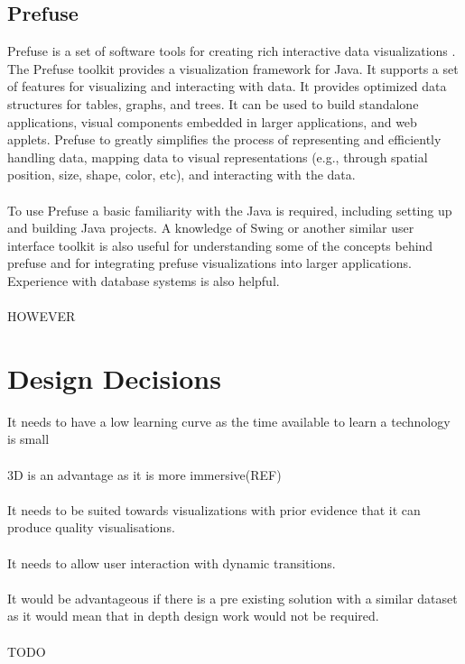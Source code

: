\documentclass[11pt
              , a4paper
              , twoside
              , openright
              ]{report}
\begin{document}
\subsection{Prefuse}
Prefuse is a set of software tools for creating rich interactive data visualizations \cite{prefuse}. The Prefuse toolkit provides a visualization framework for Java.  It supports a set of features for visualizing and interacting with data. It provides optimized data structures for tables, graphs, and trees. It can be used to build standalone applications, visual components embedded in larger applications, and web applets. Prefuse to greatly simplifies the process of representing and efficiently handling data, mapping data to visual representations (e.g., through spatial position, size, shape, color, etc), and interacting with the data. 
\\\\
To use Prefuse a basic familiarity with the Java is required, including setting up and building Java projects. A knowledge of Swing or another similar user interface toolkit is also useful for understanding some of the concepts behind prefuse and for integrating prefuse visualizations into larger applications. Experience with database systems is also helpful.
\\\\
HOWEVER
\section{Design Decisions}
It needs to have a low learning curve as the time available to learn a technology is small
\\\\
3D is an advantage as it is more immersive(REF)
\\\\
It needs to be suited towards visualizations with prior evidence that it can produce quality visualisations.
\\\\
It needs to allow user interaction with dynamic transitions.
\\\\
It would be advantageous  if there is a pre existing solution with a similar dataset as it would mean that in depth design work would not be required.
\\\\
TODO
\end{document}
